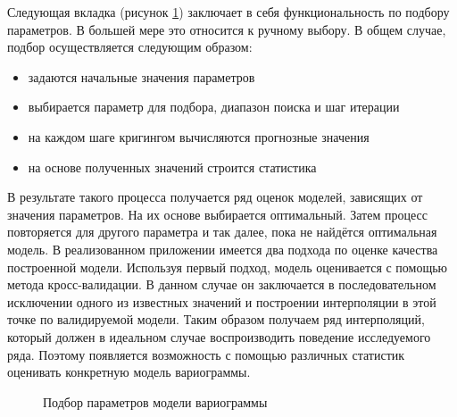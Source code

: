 Следующая вкладка (рисунок \ref{img:mod_fit}) заключает в себя функциональность по подбору параметров. В большей мере это относится к ручному выбору. В общем случае, подбор осуществляется следующим образом:
\begin{itemize}
	\item задаются начальные значения параметров
	\item выбирается параметр для подбора, диапазон поиска и шаг итерации
	\item на каждом шаге кригингом вычисляются прогнозные значения
	\item на основе полученных значений строится статистика
\end{itemize}
В результате такого процесса получается ряд оценок моделей, зависящих от значения параметров. На их основе выбирается оптимальный. Затем процесс повторяется для другого параметра и так далее, пока не найдётся оптимальная модель. В реализованном приложении имеется два подхода по оценке качества построенной модели. Используя первый подход, модель оценивается с помощью метода кросс-валидации. В данном случае он заключается в последовательном исключении одного из известных значений и построении интерполяции в этой точке по валидируемой модели. Таким образом получаем ряд интерполяций, который должен в идеальном случае воспроизводить поведение исследуемого ряда. Поэтому появляется возможность с помощью различных статистик оценивать конкретную модель вариограммы.
\begin{figure}[ht]
\caption{Подбор параметров модели вариограммы}
\label{img:mod_fit}
\end{figure}
